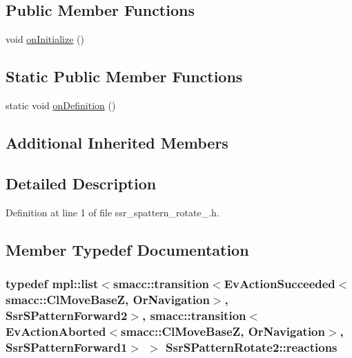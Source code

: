 \subsection*{Public Member Functions}
\begin{DoxyCompactItemize}
\item 
void \hyperlink{structSsrSPatternRotate2_acae719a6c582b769e997fd4a8f79d12a}{on\+Initialize} ()
\end{DoxyCompactItemize}
\subsection*{Static Public Member Functions}
\begin{DoxyCompactItemize}
\item 
static void \hyperlink{structSsrSPatternRotate2_acfc99af790632321111d347cd4315338}{on\+Definition} ()
\end{DoxyCompactItemize}
\subsection*{Additional Inherited Members}


\subsection{Detailed Description}


Definition at line 1 of file ssr\+\_\+spattern\+\_\+rotate\+\_.\+h.



\subsection{Member Typedef Documentation}
\subsubsection[{\texorpdfstring{reactions}{reactions}}]{\setlength{\rightskip}{0pt plus 5cm}typedef mpl\+::list$<${\bf smacc\+::transition}$<$Ev\+Action\+Succeeded$<${\bf smacc\+::\+Cl\+Move\+BaseZ}, Or\+Navigation$>$, {\bf Ssr\+S\+Pattern\+Forward2}$>$, {\bf smacc\+::transition}$<$Ev\+Action\+Aborted$<${\bf smacc\+::\+Cl\+Move\+BaseZ}, Or\+Navigation$>$, {\bf Ssr\+S\+Pattern\+Forward1}$>$ $>$ {\bf Ssr\+S\+Pattern\+Rotate2\+::reactions}}\hypertarget{structSsrSPatternRotate2_aec40f8fec6467ee60f0aecd09936d68f}{}\label{structSsrSPatternRotate2_aec40f8fec6467ee60f0aecd09936d68f}



